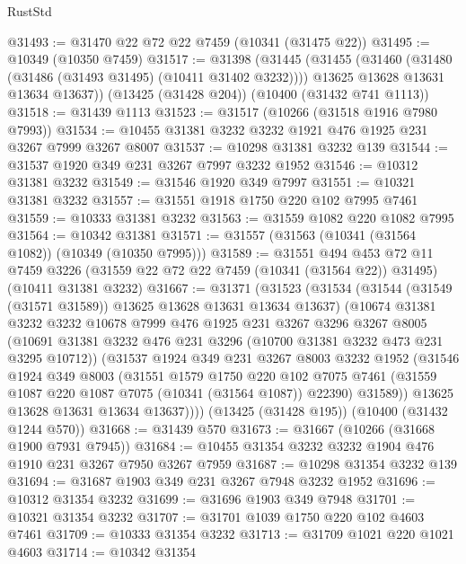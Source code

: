 \begin{lexlean}{RustStd}
\begin{coremodule}
@31493 := @31470 @22 @72 @22 @7459 (@10341 (@31475 @22))
@31495 := @10349 (@10350 @7459)
@31517 := @31398
    (@31445
      (@31455
        (@31460 (@31480 (@31486 (@31493 @31495) (@10411 @31402 @3232))))
        @13625
        @13628
        @13631
        @13634
        @13637))
    (@13425 (@31428 @204))
    (@10400 (@31432 @741 @1113))
@31518 := @31439 @1113
@31523 := @31517 (@10266 (@31518 @1916 @7980 @7993))
@31534 := @10455 @31381 @3232 @3232 @1921 @476 @1925 @231 @3267 @7999 @3267 @8007
@31537 := @10298 @31381 @3232 @139
@31544 := @31537 @1920 @349 @231 @3267 @7997 @3232 @1952
@31546 := @10312 @31381 @3232
@31549 := @31546 @1920 @349 @7997
@31551 := @10321 @31381 @3232
@31557 := @31551 @1918 @1750 @220 @102 @7995 @7461
@31559 := @10333 @31381 @3232
@31563 := @31559 @1082 @220 @1082 @7995
@31564 := @10342 @31381
@31571 := @31557 (@31563 (@10341 (@31564 @1082)) (@10349 (@10350 @7995)))
@31589 := @31551
    @494
    @453
    @72
    @11
    @7459
    @3226
    (@31559 @22 @72 @22 @7459 (@10341 (@31564 @22)) @31495)
    (@10411 @31381 @3232)
@31667 := @31371
    (@31523
      (@31534
        (@31544 (@31549 (@31571 @31589)) @13625 @13628 @13631 @13634 @13637)
        (@10674
          @31381
          @3232
          @3232
          @10678
          @7999
          @476
          @1925
          @231
          @3267
          @3296
          @3267
          @8005
          (@10691 @31381 @3232 @476 @231 @3296 (@10700 @31381 @3232 @473 @231 @3295 @10712))
          (@31537
            @1924
            @349
            @231
            @3267
            @8003
            @3232
            @1952
            (@31546
              @1924
              @349
              @8003
              (@31551
                @1579
                @1750
                @220
                @102
                @7075
                @7461
                (@31559 @1087 @220 @1087 @7075 (@10341 (@31564 @1087)) @22390)
                @31589))
            @13625
            @13628
            @13631
            @13634
            @13637))))
    (@13425 (@31428 @195))
    (@10400 (@31432 @1244 @570))
@31668 := @31439 @570
@31673 := @31667 (@10266 (@31668 @1900 @7931 @7945))
@31684 := @10455 @31354 @3232 @3232 @1904 @476 @1910 @231 @3267 @7950 @3267 @7959
@31687 := @10298 @31354 @3232 @139
@31694 := @31687 @1903 @349 @231 @3267 @7948 @3232 @1952
@31696 := @10312 @31354 @3232
@31699 := @31696 @1903 @349 @7948
@31701 := @10321 @31354 @3232
@31707 := @31701 @1039 @1750 @220 @102 @4603 @7461
@31709 := @10333 @31354 @3232
@31713 := @31709 @1021 @220 @1021 @4603
@31714 := @10342 @31354

\end{coremodule}
\end{lexlean}
